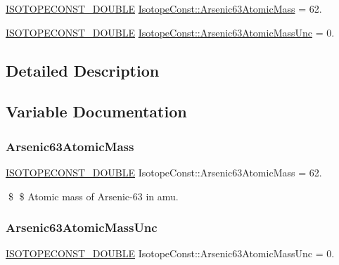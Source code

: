 \begin{DoxyCompactItemize}
\item 
\mbox{\hyperlink{group___isotope_const-_macros_ga8f45a7272ce02c0b4c65c44636ed719a}{I\+S\+O\+T\+O\+P\+E\+C\+O\+N\+S\+T\+\_\+\+D\+O\+U\+B\+LE}} \mbox{\hyperlink{group___isotope_const-_arsenic-_as63_ga04c3fb68a6f3c141946e8486bd03cc34}{Isotope\+Const\+::\+Arsenic63\+Atomic\+Mass}} = 62.
\item 
\mbox{\hyperlink{group___isotope_const-_macros_ga8f45a7272ce02c0b4c65c44636ed719a}{I\+S\+O\+T\+O\+P\+E\+C\+O\+N\+S\+T\+\_\+\+D\+O\+U\+B\+LE}} \mbox{\hyperlink{group___isotope_const-_arsenic-_as63_ga8cf8d08fb4759cd1af4a328e48a49419}{Isotope\+Const\+::\+Arsenic63\+Atomic\+Mass\+Unc}} = 0.
\end{DoxyCompactItemize}


\subsection{Detailed Description}


\subsection{Variable Documentation}
\mbox{\label{group___isotope_const-_arsenic-_as63_ga04c3fb68a6f3c141946e8486bd03cc34}} 
\subsubsection{\texorpdfstring{Arsenic63\+Atomic\+Mass}{Arsenic63AtomicMass}}
{\footnotesize\ttfamily \mbox{\hyperlink{group___isotope_const-_macros_ga8f45a7272ce02c0b4c65c44636ed719a}{I\+S\+O\+T\+O\+P\+E\+C\+O\+N\+S\+T\+\_\+\+D\+O\+U\+B\+LE}} Isotope\+Const\+::\+Arsenic63\+Atomic\+Mass = 62.}

\$ \$ Atomic mass of Arsenic-\/63 in amu. \mbox{\label{group___isotope_const-_arsenic-_as63_ga8cf8d08fb4759cd1af4a328e48a49419}} 
\subsubsection{\texorpdfstring{Arsenic63\+Atomic\+Mass\+Unc}{Arsenic63AtomicMassUnc}}
{\footnotesize\ttfamily \mbox{\hyperlink{group___isotope_const-_macros_ga8f45a7272ce02c0b4c65c44636ed719a}{I\+S\+O\+T\+O\+P\+E\+C\+O\+N\+S\+T\+\_\+\+D\+O\+U\+B\+LE}} Isotope\+Const\+::\+Arsenic63\+Atomic\+Mass\+Unc = 0.}

